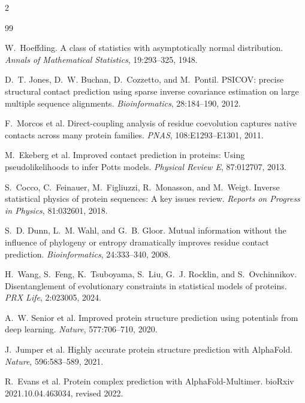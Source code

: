 \documentclass[10pt]{article}
\begin{document}
\scriptsize
\begin{multicols}{2}
\raggedcolumns
\begin{thebibliography}{99}
\setlength{\itemsep}{-0.2pt}
\setlength{\parskip}{0pt}

W.~Hoeffding.
\newblock A class of statistics with asymptotically normal distribution.
\newblock \emph{Annals of Mathematical Statistics}, 19:293--325, 1948.

D.~T. Jones, D.~W. Buchan, D.~Cozzetto, and M.~Pontil.
\newblock PSICOV: precise structural contact prediction using sparse inverse covariance estimation
on large multiple sequence alignments.
\newblock \emph{Bioinformatics}, 28:184--190, 2012.

F.~Morcos et al.
\newblock Direct-coupling analysis of residue coevolution captures native contacts across many
protein families.
\newblock \emph{PNAS}, 108:E1293--E1301, 2011.

M.~Ekeberg et al.
\newblock Improved contact prediction in proteins: Using pseudolikelihoods to infer Potts models.
\newblock \emph{Physical Review E}, 87:012707, 2013.

S.~Cocco, C.~Feinauer, M.~Figliuzzi, R.~Monasson, and M.~Weigt.
\newblock Inverse statistical physics of protein sequences: A key issues review.
\newblock \emph{Reports on Progress in Physics}, 81:032601, 2018.

S.~D. Dunn, L.~M. Wahl, and G.~B. Gloor.
\newblock Mutual information without the influence of phylogeny or entropy dramatically improves
residue contact prediction.
\newblock \emph{Bioinformatics}, 24:333--340, 2008.

H.~Wang, S.~Feng, K.~Tsuboyama, S.~Liu, G.~J. Rocklin, and S.~Ovchinnikov.
\newblock Disentanglement of evolutionary constraints in statistical models of proteins.
\newblock \emph{PRX Life}, 2:023005, 2024.

A.~W. Senior et al.
\newblock Improved protein structure prediction using potentials from deep learning.
\newblock \emph{Nature}, 577:706--710, 2020.

J.~Jumper et al.
\newblock Highly accurate protein structure prediction with AlphaFold.
\newblock \emph{Nature}, 596:583--589, 2021.

R.~Evans et al.
\newblock Protein complex prediction with AlphaFold-Multimer.
\newblock bioRxiv 2021.10.04.463034, revised 2022.


\end{thebibliography}
\end{multicols}
\end{document}
